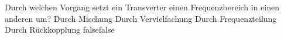     {Durch welchen Vorgang setzt ein Transverter einen Frequenzbereich in einen anderen um?}
    {Durch Mischung}
    {Durch Vervielfachung}
    {Durch Frequenzteilung}
    {Durch Rückkopplung}
    {false}{false}
